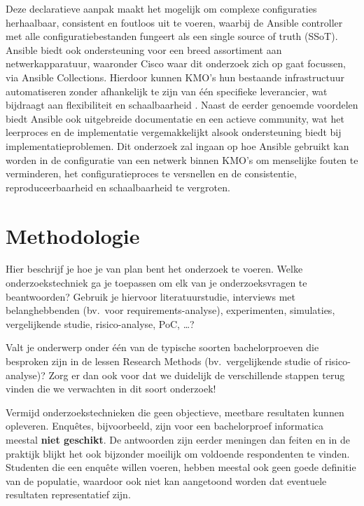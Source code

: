Deze declaratieve aanpak maakt het mogelijk om complexe configuraties herhaalbaar, consistent en foutloos uit te voeren, waarbij de Ansible controller met alle configuratiebestanden fungeert als een single source of truth (SSoT).
Ansible biedt ook ondersteuning voor een breed assortiment aan netwerkapparatuur, waaronder Cisco waar dit onderzoek zich op gaat focussen, via Ansible Collections.
Hierdoor kunnen KMO’s hun bestaande infrastructuur automatiseren zonder afhankelijk te zijn van één specifieke leverancier, wat bijdraagt aan flexibiliteit en schaalbaarheid \autocite{Cisco2023}.
Naast de eerder genoemde voordelen biedt Ansible ook uitgebreide documentatie en een actieve community, wat het leerproces en de implementatie vergemakkelijkt alsook ondersteuning biedt bij implementatieproblemen.
Dit onderzoek zal ingaan op hoe Ansible gebruikt kan worden in de configuratie van een netwerk binnen KMO's om menselijke fouten te verminderen, het configuratieproces te versnellen en de consistentie, reproduceerbaarheid en schaalbaarheid te vergroten.

\section{Methodologie}%
\label{sec:methodologie}

Hier beschrijf je hoe je van plan bent het onderzoek te voeren. Welke onderzoekstechniek ga je toepassen om elk van je onderzoeksvragen te beantwoorden? Gebruik je hiervoor literatuurstudie, interviews met belanghebbenden (bv.~voor requirements-analyse), experimenten, simulaties, vergelijkende studie, risico-analyse, PoC, \ldots?

Valt je onderwerp onder één van de typische soorten bachelorproeven die besproken zijn in de lessen Research Methods (bv.\ vergelijkende studie of risico-analyse)? Zorg er dan ook voor dat we duidelijk de verschillende stappen terug vinden die we verwachten in dit soort onderzoek!

Vermijd onderzoekstechnieken die geen objectieve, meetbare resultaten kunnen opleveren. Enquêtes, bijvoorbeeld, zijn voor een bachelorproef informatica meestal \textbf{niet geschikt}. De antwoorden zijn eerder meningen dan feiten en in de praktijk blijkt het ook bijzonder moeilijk om voldoende respondenten te vinden. Studenten die een enquête willen voeren, hebben meestal ook geen goede definitie van de populatie, waardoor ook niet kan aangetoond worden dat eventuele resultaten representatief zijn.

